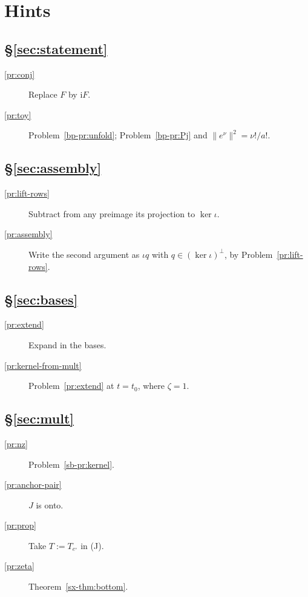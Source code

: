 \documentclass[reqno]{amsart}
\theoremstyle{definition}
\theoremstyle{plain}
\theoremstyle{remark}
\begin{document}
\section*{Hints}

\subsection*{\S\ref{sec:statement}}
\begin{description}
\item[\ref{pr:conj}] Replace \(F\) by \(\mathrm iF\).
\item[\ref{pr:toy}] Problem~\ref{bp-pr:unfold}; Problem~\ref{bp-pr:Pj} and \(\lVert e^\nu\rVert^2=\nu!/a!\).
\end{description}

\subsection*{\S\ref{sec:assembly}}
\begin{description}
\item[\ref{pr:lift-rows}] Subtract from any preimage its projection to \(\ker\iota\).
\item[\ref{pr:assembly}] Write the second argument as \(\iota q\) with \(q\in(\ker\iota)^\perp\), by Problem~\ref{pr:lift-rows}.
\end{description}

\subsection*{\S\ref{sec:bases}}
\begin{description}
\item[\ref{pr:extend}] Expand in the bases.
\item[\ref{pr:kernel-from-mult}] Problem~\ref{pr:extend} at \(t=t_0\), where \(\zeta=1\).
\end{description}

\subsection*{\S\ref{sec:mult}}
\begin{description}
\item[\ref{pr:nz}] Problem~\ref{sb-pr:kernel}.
\item[\ref{pr:anchor-pair}] \(J\) is onto.
\item[\ref{pr:prop}] Take \(T:=T_{e^\circ}\) in (J).
\item[\ref{pr:zeta}] Theorem~\ref{sx-thm:bottom}.
\end{description}
\end{document}
